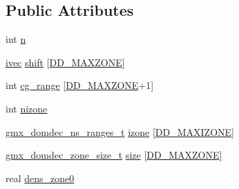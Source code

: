 \subsection*{\-Public \-Attributes}
\begin{DoxyCompactItemize}
\item 
int \hyperlink{structgmx__domdec__zones__t_aaf1736ae55077d0d68b1c7d5751751c4}{n}
\item 
\hyperlink{share_2template_2gromacs_2types_2simple_8h_a74f6ffdb4a9c1764f5293969d8c681b6}{ivec} \hyperlink{structgmx__domdec__zones__t_acfec2e09cd9a1ba99ce23056c8c47b09}{shift} \mbox{[}\hyperlink{share_2template_2gromacs_2types_2commrec_8h_a3b86a3e7600a7f346fb156e79c7e8ae5}{\-D\-D\-\_\-\-M\-A\-X\-Z\-O\-N\-E}\mbox{]}
\item 
int \hyperlink{structgmx__domdec__zones__t_ad2a14ffff877561140bc23cb99745b66}{cg\-\_\-range} \mbox{[}\hyperlink{share_2template_2gromacs_2types_2commrec_8h_a3b86a3e7600a7f346fb156e79c7e8ae5}{\-D\-D\-\_\-\-M\-A\-X\-Z\-O\-N\-E}+1\mbox{]}
\item 
int \hyperlink{structgmx__domdec__zones__t_aa95e6c5e8b4b28874a53f46107e74e46}{nizone}
\item 
\hyperlink{structgmx__domdec__ns__ranges__t}{gmx\-\_\-domdec\-\_\-ns\-\_\-ranges\-\_\-t} \hyperlink{structgmx__domdec__zones__t_afb202295a02e6eef6d46a7693b2692e6}{izone} \mbox{[}\hyperlink{share_2template_2gromacs_2types_2commrec_8h_a9abab5b4994c2ff0d52704a0f0632d31}{\-D\-D\-\_\-\-M\-A\-X\-I\-Z\-O\-N\-E}\mbox{]}
\item 
\hyperlink{structgmx__domdec__zone__size__t}{gmx\-\_\-domdec\-\_\-zone\-\_\-size\-\_\-t} \hyperlink{structgmx__domdec__zones__t_af6e8bdea264ad4f400686afe61196fa0}{size} \mbox{[}\hyperlink{share_2template_2gromacs_2types_2commrec_8h_a3b86a3e7600a7f346fb156e79c7e8ae5}{\-D\-D\-\_\-\-M\-A\-X\-Z\-O\-N\-E}\mbox{]}
\item 
real \hyperlink{structgmx__domdec__zones__t_abe81b9e7d22e01ef7e77db770790f828}{dens\-\_\-zone0}
\end{DoxyCompactItemize}



